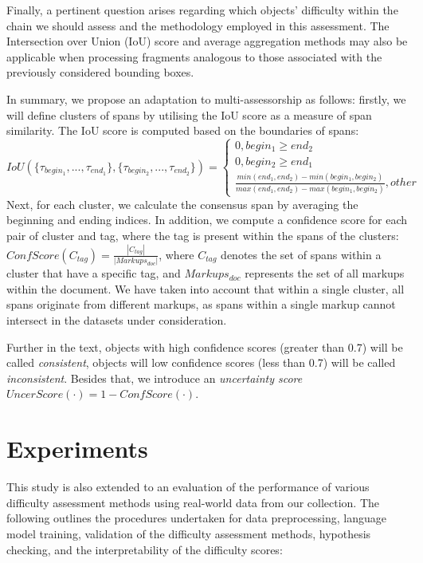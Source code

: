 \documentclass{article}
\begin{document}
Finally, a pertinent question arises regarding which objects' difficulty within the chain we should assess and the methodology employed in this assessment. The Intersection over Union (IoU) score and average aggregation methods may also be applicable when processing fragments analogous to those associated with the previously considered bounding boxes.

In summary, we propose an adaptation to multi-assessorship as follows: firstly, we will define clusters of spans by utilising the IoU score as a measure of span similarity. The IoU score is computed based on the boundaries of spans:
$$IoU(\{\tau_{begin_1}, ..., \tau_{end_1}\}, \{\tau_{begin_2}, ..., \tau_{end_2}\}) = \begin{cases}
0, begin_1 \geq end_2 \\
0, begin_2 \geq end_1 \\
\frac{min(end_1, end_2) - min(begin_1, begin_2)}{max(end_1, end_2) - max(begin_1, begin_2)}, other
\end{cases}$$
Next, for each cluster, we calculate the consensus span by averaging the beginning and ending indices. In addition, we compute a confidence score for each pair of cluster and tag, where the tag is present within the spans of the clusters: $ConfScore(C_{tag}) = \frac{|C_{tag}|}{|Markups_{doc}|}$, where $C_{tag}$ denotes the set of spans within a cluster that have a specific tag, and $Markups_{doc}$ represents the set of all markups within the document. We have taken into account that within a single cluster, all spans originate from different markups, as spans within a single markup cannot intersect in the datasets under consideration. 

Further in the text, objects with high confidence scores (greater than 0.7) will be called \emph{consistent}, objects will low confidence scores (less than 0.7) will be called \emph{inconsistent}. Besides that, we introduce an \emph{uncertainty score} $UncerScore(\cdot) = 1-ConfScore(\cdot)$.

\section{Experiments}
This study is also extended to an evaluation of the performance of various difficulty assessment methods using real-world data from our collection. The following outlines the procedures undertaken for data preprocessing, language model training, validation of the difficulty assessment methods, hypothesis checking, and the interpretability of the difficulty scores:
\end{document}

